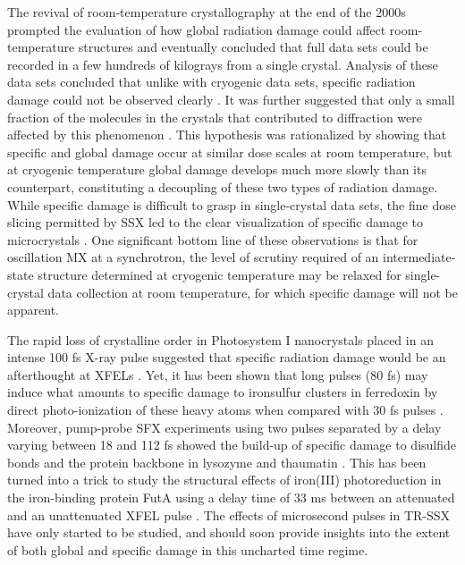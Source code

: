 The revival of room-temperature crystallography at the end of the 2000s \parencite{fraserHiddenAlternateStructures2009,fraserAccessingProteinConformational2011} prompted the evaluation of how global radiation damage could affect room-temperature structures \parencite{southworth-daviesObservationDecreasedRadiation2007,lealSurveyGlobalRadiation2013} and eventually concluded that full data sets could be recorded in a few hundreds of kilograys from a single crystal. Analysis of these data sets concluded that unlike with cryogenic data sets, specific radiation damage could not be observed clearly \parencite{russiConformationalVariationProteins2017,gotthardSpecificRadiationDamage2019}. It was further suggested that only a small fraction of the molecules in the crystals that contributed to diffraction were affected by this phenomenon \parencite{gotthardSpecificRadiationDamage2019}. This hypothesis was rationalized by showing that specific and global damage occur at similar dose scales at room temperature, but at cryogenic temperature global damage develops much more slowly than its counterpart, constituting a decoupling of these two types of radiation damage. While specific damage is difficult to grasp in single-crystal data sets, the fine dose slicing permitted by SSX led to the clear visualization of specific damage to microcrystals \parencite{schubertMulticrystalDiffractionDatacollection2016,delamoraRadiationDamageDose2020}. One significant bottom line of these observations is that for oscillation MX at a synchrotron, the level of scrutiny required of an intermediate-state structure determined at cryogenic temperature may be relaxed for single-crystal data collection at room temperature, for which specific damage will not be apparent. 

The rapid loss of crystalline order in Photosystem I nanocrystals placed in an intense 100 fs X-ray pulse suggested that specific radiation damage would be an afterthought at XFELs \parencite{bartySelfterminatingDiffractionGates2012}. Yet, it has been shown that long pulses (80 fs) may induce what amounts to specific damage to ironsulfur clusters in ferredoxin by direct photo-ionization of these heavy atoms when compared with 30 fs pulses \parencite{nassIndicationsRadiationDamage2015}. Moreover, pump-probe SFX experiments using two pulses separated by a delay varying between 18 and 112 fs showed the build-up of specific damage to disulfide bonds and the protein backbone in lysozyme and thaumatin \parencite{nassStructuralDynamicsProteins2020}. This has been turned into a trick to study the structural effects of iron(III) photoreduction in the iron-binding protein FutA using a delay time of 33 ms between an attenuated and an unattenuated XFEL pulse \parencite{boltonRedoxSwitchAllows2024}. The effects of microsecond pulses in TR-SSX have only started to be studied, and should soon provide insights into the extent of both global and specific damage in this uncharted time regime.

